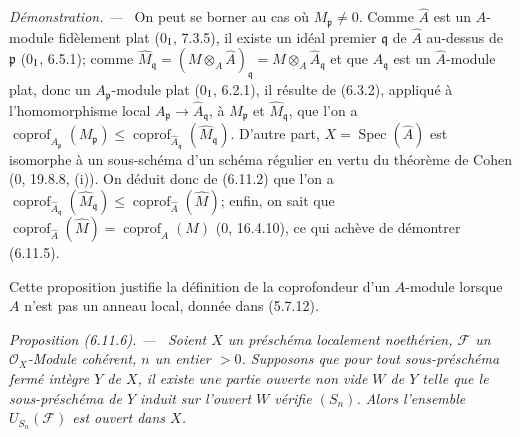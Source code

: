 \documentclass[10pt,oneside]{book}
\newenvironment{proposition}[1][]{%
  \par\medskip\noindent\itshape Proposition (#1). ---\ }{\par}
\newenvironment{proof}{%
  \par\medskip\noindent\textit{Démonstration. ---\ }}{\par}
\begin{document}
\begin{proof}
On peut se borner au cas où $M_{\mathfrak p}\ne0$. Comme $\widehat A$ est
un $A$-module fidèlement plat (0$_{\rm I}$, 7.3.5), il existe un idéal
premier $\mathfrak q$ de $\widehat A$ au-dessus de $\mathfrak p$
(0$_{\rm I}$, 6.5.1); comme
$\widehat M_{\mathfrak q}=(M\otimes_A\widehat A)_{\mathfrak q}
=M\otimes_A\widehat A_{\mathfrak q}$ et que
$\widehat A_{\mathfrak q}$ est un $\widehat A$-module plat, donc un
$A_{\mathfrak p}$-module plat (0$_{\rm I}$, 6.2.1), il résulte de (6.3.2),
appliqué à l'homomorphisme local
$A_{\mathfrak p}\to\widehat A_{\mathfrak q}$, à $M_{\mathfrak p}$ et
$\widehat M_{\mathfrak q}$, que l'on a
$\operatorname{coprof}_{A_{\mathfrak p}}(M_{\mathfrak p})\leq
\operatorname{coprof}_{\widehat A_{\mathfrak q}}
(\widehat M_{\mathfrak q})$. D'autre part,
$X=\operatorname{Spec}(\widehat A)$ est isomorphe à un sous-schéma d'un
schéma régulier en vertu du théorème de Cohen (0, 19.8.8, (i)). On déduit
donc de (6.11.2) que l'on a
$\operatorname{coprof}_{\widehat A_{\mathfrak q}}
(\widehat M_{\mathfrak q})\leq
\operatorname{coprof}_{\widehat A}(\widehat M)$; enfin, on sait que
$\operatorname{coprof}_{\widehat A}(\widehat M)=
\operatorname{coprof}_A(M)$ (0, 16.4.10), ce qui achève de démontrer
(6.11.5).
\end{proof}

Cette proposition justifie la définition de la coprofondeur d'un
$A$-module lorsque $A$ n'est pas un anneau local, donnée dans (5.7.12).

\begin{proposition}[6.11.6]
\label{IV.2.s6.11.6-fr}
Soient $X$ un préschéma localement noethérien, $\mathcal F$ un
$\mathcal O_X$-Module cohérent, $n$ un entier $>0$. Supposons que pour tout
sous-préschéma fermé intègre $Y$ de $X$, il existe une partie ouverte non
vide $W$ de $Y$ telle que le sous-préschéma de $Y$ induit sur l'ouvert $W$
vérifie $(S_n)$. Alors l'ensemble $U_{S_n}(\mathcal F)$ est ouvert dans
$X$.
\end{proposition}
\end{document}
